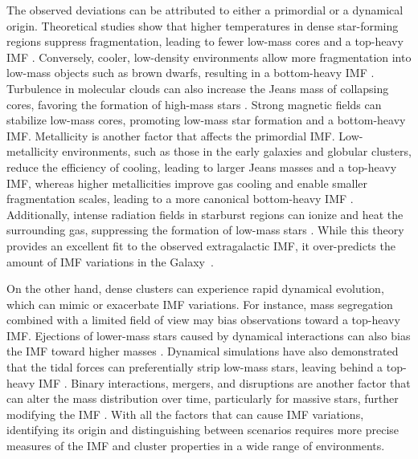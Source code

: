 \documentclass[12pt]{ucsddissertation}
\begin{document}
\begin{CJK*}{UTF8}{gbsn}
The observed deviations can be attributed to either a primordial or a dynamical origin. Theoretical studies show that higher temperatures in dense star-forming regions suppress fragmentation, leading to fewer low-mass cores and a top-heavy IMF \citep[][]{Larson-1998, Bate-2009b}. Conversely, cooler, low-density environments allow more fragmentation into low-mass objects such as brown dwarfs, resulting in a bottom-heavy IMF \citep[][]{Jappsen-2005, Bonnell-2008}. Turbulence in molecular clouds can also increase the Jeans mass of collapsing cores, favoring the formation of high-mass stars \citep[][]{Bonnell-1998, Padoan-2002, Larson-2005, Hopkins-2013, Chabrier-2014}. Strong magnetic fields can stabilize low-mass cores, promoting low-mass star formation and a bottom-heavy IMF. Metallicity is another factor that affects the primordial IMF. Low-metallicity environments, such as those in the early galaxies and globular clusters, reduce the efficiency of cooling, leading to larger Jeans masses and a top-heavy IMF\citep[][]{Omukai-2005}, whereas higher metallicities improve gas cooling and enable smaller fragmentation scales, leading to a more canonical bottom-heavy IMF \citep[][]{Chabrier-2003}. Additionally, intense radiation fields in starburst regions can ionize and heat the surrounding gas, suppressing the formation of low-mass stars \citep[][]{Krumholz-2009}. While this theory provides an excellent fit to the observed extragalactic IMF, it over-predicts the amount of IMF variations in the Galaxy~\cite{Guszejnov-2019}.  

On the other hand, dense clusters can experience rapid dynamical evolution, which can mimic or exacerbate IMF variations. For instance, mass segregation combined with a limited field of view may bias observations toward a top-heavy IMF. Ejections of lower-mass stars caused by dynamical interactions can also bias the IMF toward higher masses \citep[][]{Marks-2012}. Dynamical simulations have also demonstrated that the tidal forces can preferentially strip low-mass stars, leaving behind a top-heavy IMF \citep[][]{Baumgardt-2003, Park-2020}. Binary interactions, mergers, and disruptions are another factor that can alter the mass distribution over time, particularly for massive stars, further modifying the IMF \citep[][]{Sana-2012}. With all the factors that can cause IMF variations, identifying its origin and distinguishing between scenarios requires more precise measures of the IMF and cluster properties in a wide range of environments.


\end{CJK*}
\end{document}
